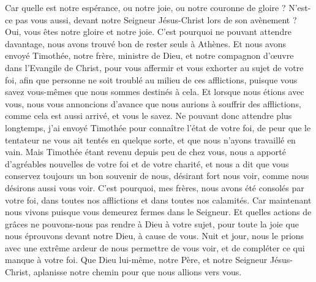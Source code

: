 \begin{multicols}{2}
Car quelle est notre espérance, ou notre joie, ou notre couronne de gloire ? N’est-ce pas vous aussi, devant notre Seigneur Jésus-Christ lors de son avènement ?
Oui, vous êtes notre gloire et notre joie.
\VerseOne{}C'est pourquoi ne pouvant attendre davantage, nous avons trouvé bon de rester seuls à Athènes.
Et nous avons envoyé Timothée, notre frère, ministre de Dieu, et notre compagnon d’œuvre dans l'Evangile de Christ, pour vous affermir et vous exhorter au sujet de votre foi,
afin que personne ne soit troublé au milieu de ces afflictions, puisque vous savez vous-mêmes que nous sommes destinés à cela.
Et lorsque nous étions avec vous, nous vous annoncions d’avance que nous aurions à souffrir des afflictions, comme cela est aussi arrivé, et vous le savez.
Ne pouvant donc attendre plus longtemps, j'ai envoyé Timothée pour connaître l'état de votre foi, de peur que le tentateur ne vous ait tentés en quelque sorte, et que nous n’ayons travaillé en vain.
Mais Timothée étant revenu depuis peu de chez vous, nous a apporté d'agréables nouvelles de votre foi et de votre charité, et nous a dit que vous conservez toujours un bon souvenir de nous, désirant fort nous voir, comme nous désirons aussi vous voir.
C'est pourquoi, mes frères, nous avons été consolés par votre foi, dans toutes nos afflictions et dans toutes nos calamités.
Car maintenant nous vivons puisque vous demeurez fermes dans le Seigneur.
Et quelles actions de grâces ne pouvons-nous pas rendre à Dieu à votre sujet, pour toute la joie que nous éprouvons devant notre Dieu, à cause de vous.
Nuit et jour, nous le prions avec une extrême ardeur de nous permettre de vous voir, et de compléter ce qui manque à votre foi.
Que Dieu lui-même, notre Père, et notre Seigneur Jésus-Christ, aplanisse notre chemin pour que nous allions vers vous.

\end{multicols}
